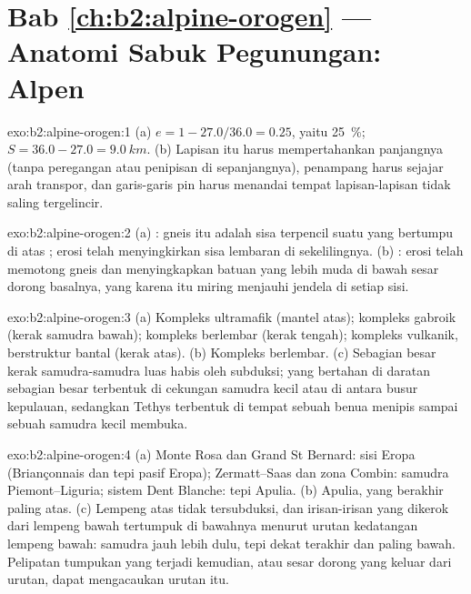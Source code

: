 \section*{Bab \ref{ch:b2:alpine-orogen} --- Anatomi Sabuk Pegunungan: Alpen}

\begin{solution}{exo:b2:alpine-orogen:1}
(a) $e = 1 - 27.0/36.0 = 0.25$, yaitu \qty{25}{\percent}; $S = 36.0 - 27.0 =
\qty{9.0}{km}$. (b) Lapisan itu harus mempertahankan panjangnya (tanpa peregangan atau penipisan di sepanjangnya),
penampang harus sejajar arah transpor, dan garis-garis pin harus menandai tempat
lapisan-lapisan tidak saling tergelincir.
\end{solution}

\begin{solution}{exo:b2:alpine-orogen:2}
(a) : gneis itu adalah sisa terpencil suatu  yang bertumpu di atas ;
erosi telah menyingkirkan sisa lembaran di sekelilingnya. (b) : erosi telah
memotong  gneis dan menyingkapkan batuan yang lebih muda di bawah sesar dorong basalnya, yang
karena itu miring menjauhi jendela di setiap sisi.
\end{solution}

\begin{solution}{exo:b2:alpine-orogen:3}
(a) Kompleks ultramafik (mantel atas); kompleks gabroik (kerak samudra bawah);
kompleks  berlembar (kerak tengah); kompleks vulkanik, berstruktur bantal (kerak atas).
(b) Kompleks  berlembar. (c) Sebagian besar kerak samudra-samudra luas habis oleh subduksi;
 yang bertahan di daratan sebagian besar terbentuk di cekungan samudra kecil atau di antara busur
kepulauan, sedangkan  Tethys terbentuk di tempat sebuah benua menipis sampai sebuah samudra kecil membuka.
\end{solution}

\begin{solution}{exo:b2:alpine-orogen:4}
(a)  Monte Rosa dan Grand St Bernard: sisi Eropa (Briançonnais dan
tepi pasif Eropa); Zermatt--Saas dan zona Combin: samudra Piemont--Liguria; sistem Dent
Blanche: tepi Apulia. (b) Apulia, yang berakhir paling atas. (c) Lempeng atas
tidak tersubduksi, dan irisan-irisan yang dikerok dari lempeng bawah tertumpuk di bawahnya menurut urutan
kedatangan lempeng bawah: samudra jauh lebih dulu, tepi dekat terakhir dan paling bawah. Pelipatan tumpukan yang terjadi kemudian,
atau sesar dorong yang keluar dari urutan, dapat mengacaukan urutan itu.
\end{solution}

